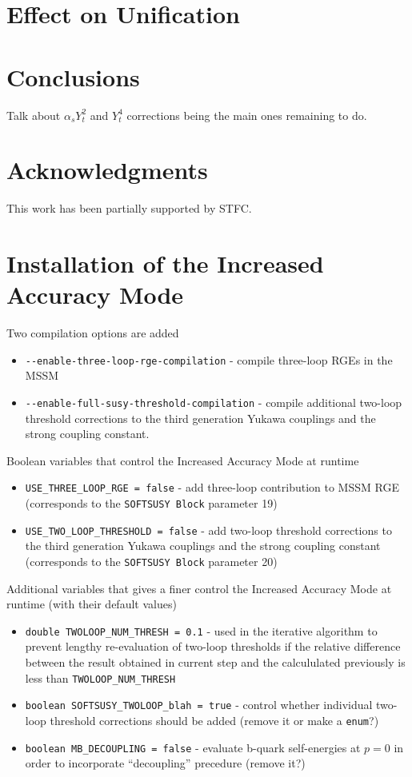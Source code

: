 \documentclass[final,3p,times,pdflatex]{elsarticle}
\def\code#1{\small{\tt #1}\normalsize}
\begin{document}
\section{Effect on Unification}

\section{Conclusions}
Talk about $\alpha_s Y_t^2$ and $Y_t^4$ corrections being the main ones
remaining to do.  

\section*{Acknowledgments}
This work has been partially supported by STFC.

\appendix

\section{Installation of the Increased Accuracy Mode}
\label{sec:install}

Two compilation options are added
\begin{itemize}
	\item[] \verb|--enable-three-loop-rge-compilation| - compile three-loop RGEs in the MSSM 
	\item[] \verb|--enable-full-susy-threshold-compilation| - compile
          additional two-loop threshold corrections to the third generation
          Yukawa couplings and the strong coupling constant.
\end{itemize}

Boolean variables that control the Increased Accuracy Mode at runtime
\begin{itemize}
	\item \verb|USE_THREE_LOOP_RGE = false|  - add three-loop contribution to MSSM RGE (corresponds to the \code{SOFTSUSY Block} parameter 19)
	\item \verb|USE_TWO_LOOP_THRESHOLD = false| - add two-loop threshold corrections to the third generation Yukawa couplings and the strong coupling constant
(corresponds to the \code{SOFTSUSY Block} parameter 20)
\end{itemize}

Additional variables that gives a finer control the Increased Accuracy Mode at runtime (with their default values)
\begin{itemize}
	\item \verb|double TWOLOOP_NUM_THRESH = 0.1|  - used in the iterative algorithm to prevent lengthy re-evaluation of two-loop thresholds 
		if the relative difference between the result obtained in current step and the  calcululated previously is less than \verb|TWOLOOP_NUM_THRESH| 
	\item \verb|boolean SOFTSUSY_TWOLOOP_blah = true| - control whether individual two-loop threshold corrections should be added (remove it or make a \verb|enum|?)
	\item \verb|boolean MB_DECOUPLING = false| - evaluate b-quark self-energies at $p=0$ in order to incorporate ``decoupling'' precedure (remove it?)
\end{itemize}
\end{document}
